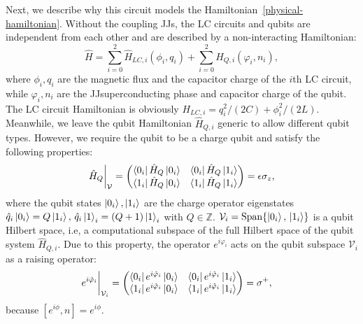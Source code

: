 \documentclass[reprint, aps, prx, amsmath, amssymb, longbibliography, superscriptaddress]{revtex4-2}
\begin{document}
Next, we describe why this circuit models the Hamiltonian~\eqref{physical-hamiltonian}. Without the coupling JJs, the LC circuits and qubits are independent from each other and are described by a non-interacting Hamiltonian:
\begin{equation}
  \hat H = \sum_{i = 0}^2 \hat H_{LC, i}(\phi_i, q_i) + \sum_{i = 0}^2 \hat H_{Q,i}(\varphi_i, n_i),
\end{equation}
where $ \phi_i, q_i$ are the magnetic flux and the capacitor charge of the $i$th LC circuit, while $\varphi_i, n_i$ are the JJsuperconducting phase and capacitor charge of the qubit. The LC circuit Hamiltonian is obviously $ H_{LC, i} = q_i^2/(2C) + \phi_i^2/(2L)$. Meanwhile, we leave the qubit Hamiltonian $\hat H_{Q,i} $ generic to allow different qubit types. However, we require the qubit to be a charge qubit and satisfy the following properties:
\begin{align}
   \hat H_{Q}\bigg|_{\mathcal{V}} = \begin{pmatrix} \bra{0_i}\hat H_Q\ket{0_i} & \bra{0_i} \hat H_Q \ket{1_i} \\ \bra{1_i} \hat H_Q \ket{0_i} & \bra{1_i} \hat H_Q \ket{1_i} \end{pmatrix} = \epsilon \sigma_z,
\end{align}
where the qubit states $\ket{0_i},\ket{1_i}$ are the charge operator eigenstates $ \hat q_i \ket{0_i} = Q \ket{1_i}, \, \hat q_{i} \ket{1}_i = (Q+1)\ket{1}_i$ with $ Q \in \mathbb{Z}$. $\mathcal{V}_i = \operatorname{Span}\{\ket{0_i},\, \ket{1_i}\}$ is a qubit Hilbert space, i.e, a computational subspace of the full Hilbert space of the qubit system $ \hat H_{Q,i}$. Due to this property, the operator $ e^{i\varphi_i} $ acts on the qubit subspace $\mathcal{V}_i$ as a raising operator:
\begin{equation}
  \begin{aligned}
    &e^{i\hat\varphi_i}\bigg|_{\mathcal{V}_i} = \begin{pmatrix} \bra{0_i} e^{i\hat\varphi_i} \ket{0_i} & \bra{0_i} e^{i\hat\varphi_i} \ket{1_i} \\ \bra{1_i} e^{i\hat\varphi_i} \ket{0_i} & \bra{1_i} e^{i\hat\varphi_i} \ket{1_i} \end{pmatrix} = \sigma^+,
  \end{aligned}
\end{equation}
because $[e^{i\phi}, n] = e^{i\phi}$.
\end{document}
